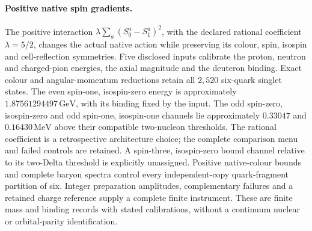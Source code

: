 \paragraph{Positive native spin gradients.}
The positive interaction
$\lambda\sum_a(S_0^a-S_1^a)^2$, with the declared rational coefficient
$\lambda=5/2$, changes the actual native action while preserving its colour,
spin, isospin and cell-reflection symmetries.
Five disclosed inputs calibrate the proton, neutron and charged-pion
energies, the axial magnitude and the deuteron binding.
Exact colour and angular-momentum reductions retain all $2{,}520$
six-quark singlet states.
The even spin-one, isospin-zero energy is approximately
$1.87561294497\,\mathrm{GeV}$, with its binding fixed by the input.
The odd spin-zero, isospin-zero and odd spin-one, isospin-one channels
lie approximately $0.33047$ and $0.16430\,\mathrm{MeV}$ above their
compatible two-nucleon thresholds.
The rational coefficient is a retrospective architecture choice; the
complete comparison menu and failed controls are retained.
A spin-three, isospin-zero bound channel relative to its two-Delta
threshold is explicitly unassigned.
Positive native-colour bounds and complete baryon spectra control every
independent-copy quark-fragment partition of six.
Integer preparation amplitudes, complementary failures and a retained
charge reference supply a complete finite instrument.
These are finite mass and binding records with stated calibrations,
without a continuum nuclear or orbital-parity identification.

